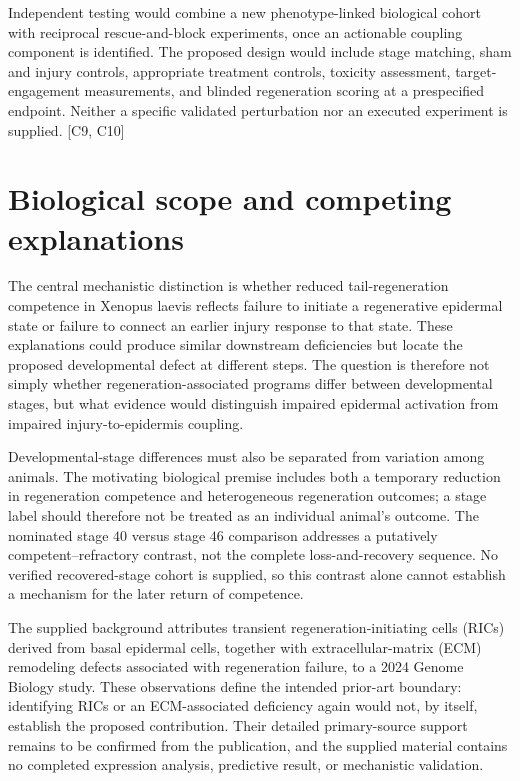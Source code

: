 \documentclass[11pt]{article}
\begin{document}
Independent testing would combine a new phenotype-linked biological cohort with reciprocal rescue-and-block experiments, once an actionable coupling component is identified. The proposed design would include stage matching, sham and injury controls, appropriate treatment controls, toxicity assessment, target-engagement measurements, and blinded regeneration scoring at a prespecified endpoint. Neither a specific validated perturbation nor an executed experiment is supplied. [C9, C10]

\section{Biological scope and competing explanations}
The central mechanistic distinction is whether reduced tail-regeneration competence in Xenopus laevis reflects failure to initiate a regenerative epidermal state or failure to connect an earlier injury response to that state. These explanations could produce similar downstream deficiencies but locate the proposed developmental defect at different steps. The question is therefore not simply whether regeneration-associated programs differ between developmental stages, but what evidence would distinguish impaired epidermal activation from impaired injury-to-epidermis coupling.

Developmental-stage differences must also be separated from variation among animals. The motivating biological premise includes both a temporary reduction in regeneration competence and heterogeneous regeneration outcomes; a stage label should therefore not be treated as an individual animal’s outcome. The nominated stage $40$ versus stage $46$ comparison addresses a putatively competent–refractory contrast, not the complete loss-and-recovery sequence. No verified recovered-stage cohort is supplied, so this contrast alone cannot establish a mechanism for the later return of competence.

The supplied background attributes transient regeneration-initiating cells (RICs) derived from basal epidermal cells, together with extracellular-matrix (ECM) remodeling defects associated with regeneration failure, to a 2024 Genome Biology study. These observations define the intended prior-art boundary: identifying RICs or an ECM-associated deficiency again would not, by itself, establish the proposed contribution. Their detailed primary-source support remains to be confirmed from the publication, and the supplied material contains no completed expression analysis, predictive result, or mechanistic validation.
\end{document}
